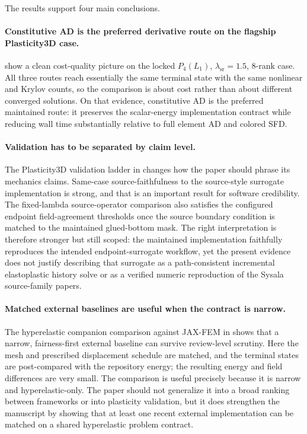 \label{sec:discussion}

The results support four main conclusions.

\paragraph{Constitutive AD is the preferred derivative route on the flagship
Plasticity3D case.}
show a clean cost-quality picture on the locked
$P_4(L_1)$, $\lambda_{\mathrm{sr}}=1.5$, 8-rank case. All three routes
reach essentially the same terminal state with the same nonlinear and Krylov
counts, so the comparison is about cost rather than about different converged
solutions. On that evidence, constitutive AD is the preferred maintained route:
it preserves the scalar-energy implementation contract while reducing wall time
substantially relative to full element AD and colored SFD.

\paragraph{Validation has to be separated by claim level.}
The Plasticity3D validation ladder in
 changes how the
paper should phrase its mechanics claims. Same-case source-faithfulness to the
source-style surrogate implementation is strong, and that is an important
result for software credibility. The fixed-lambda source-operator comparison
also satisfies the configured endpoint field-agreement thresholds once the
source boundary condition is matched to the maintained glued-bottom mask. The
right interpretation is therefore stronger but still scoped: the maintained
implementation faithfully reproduces the intended endpoint-surrogate workflow,
yet the present evidence does not justify describing that surrogate as a
path-consistent incremental elastoplastic history solve or as a verified
numeric reproduction of the Sysala source-family papers.

\paragraph{Matched external baselines are useful when the contract is narrow.}
The hyperelastic companion comparison against JAX-FEM in
shows that a narrow, fairness-first external baseline can survive review-level
scrutiny. Here the mesh and prescribed displacement schedule are matched, and
the terminal states are post-compared with the repository energy; the resulting
energy and field differences are very small. The comparison is useful precisely
because it is narrow and hyperelastic-only. The paper should not generalize it
into a broad ranking between frameworks or into plasticity validation, but it
does strengthen the manuscript by showing that at least one recent external
implementation can be matched on a shared hyperelastic problem contract.

